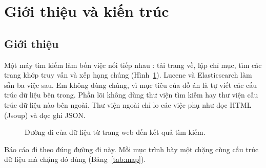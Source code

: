 \documentclass[9pt,twocolumn,a4paper]{extarticle}
\begin{document}
\section{Giới thiệu và kiến trúc}
\label{chap:intro}

\subsection{Giới thiệu}
Một máy tìm kiếm làm bốn việc nối tiếp nhau \cite{manning2008ir}: tải trang về, lập chỉ mục, tìm các trang khớp truy vấn và xếp hạng chúng (Hình~\ref{fig:pipeline}). Lucene và Elasticsearch làm sẵn ba việc sau. Em không dùng chúng, vì mục tiêu của đồ án là tự viết các cấu trúc dữ liệu bên trong. Phần lõi không dùng thư viện tìm kiếm hay thư viện cấu trúc dữ liệu nào bên ngoài. Thư viện ngoài chỉ lo các việc phụ như đọc HTML (Jsoup) và đọc ghi JSON.

\begin{figure}[H]
\centering
{}
\caption{Đường đi của dữ liệu từ trang web đến kết quả tìm kiếm.}
\label{fig:pipeline}
\end{figure}

Báo cáo đi theo đúng đường đi này. Mỗi mục trình bày một chặng cùng cấu trúc dữ liệu mà chặng đó dùng (Bảng~\ref{tab:map}).
\end{document}
